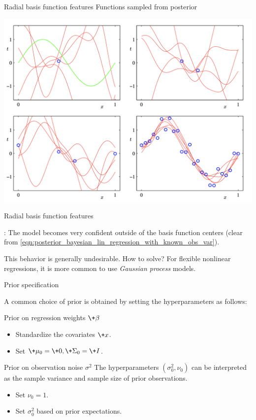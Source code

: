 \documentclass[10pt]{beamer}
\begin{document}
\begin{frame}{Radial basis function features}
Functions sampled from posterior
\begin{center}
\includegraphics[width=.8\textwidth]{images/bishop_RBF_posterior_samples}	
\end{center}

\end{frame}

\begin{frame}{Radial basis function features}

:  The model becomes very confident outside of the basis function centers {\scriptsize (clear from \eqref{eqn:posterior_bayesian_lin_regression_with_known_obs_var})}.

\vfill 
This behavior is generally undesirable. 
\vfill 
How to solve? \pause For flexible nonlinear regressions, it is more common to use \textit{Gaussian process} models. 
	
\end{frame}

\begin{frame}{Prior specification}

A common choice of prior is obtained by setting the hyperparameters as follows:

\begin{sblock}{Prior on regression weights $\+\beta$}
\begin{itemize}
\item Standardize the covariates $\+x$.
\item Set $\+\mu_0 =\+0, \+\Sigma_0 = \+I$.
\end{itemize}
\end{sblock}

\begin{sblock}{Prior on observation noise $\sigma^2$}
The hyperparameters $(\sigma_0^2,  \nu_0)$ can be interpreted as the sample variance and sample size of prior observations.

\begin{itemize}
\item Set $\nu_0=1$.
\item Set $\sigma_0^2$ based on prior expectations.
\end{itemize}
\end{sblock}
\end{frame}
\end{document}
